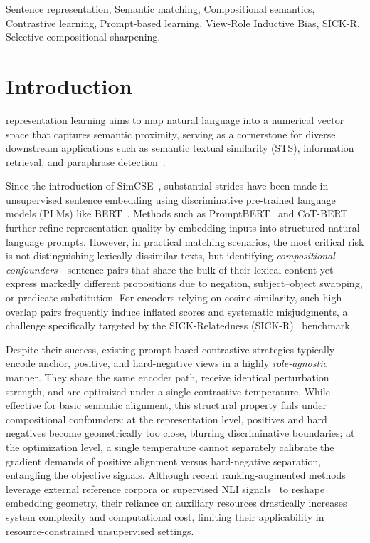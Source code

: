 \documentclass[lettersize,journal]{IEEEtran}
\begin{document}
\begin{IEEEkeywords}
Sentence representation, Semantic matching, Compositional semantics, Contrastive learning, Prompt-based learning, View-Role Inductive Bias, SICK-R, Selective compositional sharpening.
\end{IEEEkeywords}

\section{Introduction}
\label{sec:intro}


 representation learning aims to map natural language into a numerical vector space that captures semantic proximity, serving as a cornerstone for diverse downstream applications such as semantic textual similarity (STS), information retrieval, and paraphrase detection~\cite{sts3kcl}.

Since the introduction of SimCSE~\cite{simcse}, substantial strides have been made in unsupervised sentence embedding using discriminative pre-trained language models (PLMs) like BERT~\cite{bert}. Methods such as PromptBERT~\cite{promptbert} and CoT-BERT~\cite{cotbert} further refine representation quality by embedding inputs into structured natural-language prompts. However, in practical matching scenarios, the most critical risk is not distinguishing lexically dissimilar texts, but identifying \emph{compositional confounders}---sentence pairs that share the bulk of their lexical content yet express markedly different propositions due to negation, subject--object swapping, or predicate substitution. For encoders relying on cosine similarity, such high-overlap pairs frequently induce inflated scores and systematic misjudgments, a challenge specifically targeted by the SICK-Relatedness (SICK-R)~\cite{sick} benchmark.

Despite their success, existing prompt-based contrastive strategies typically encode anchor, positive, and hard-negative views in a highly \emph{role-agnostic} manner. They share the same encoder path, receive identical perturbation strength, and are optimized under a single contrastive temperature. While effective for basic semantic alignment, this structural property fails under compositional confounders: at the representation level, positives and hard negatives become geometrically too close, blurring discriminative boundaries; at the optimization level, a single temperature cannot separately calibrate the gradient demands of positive alignment versus hard-negative separation, entangling the objective signals. Although recent ranking-augmented methods~\cite{rankcse,rankencoder} leverage external reference corpora or supervised NLI signals~\cite{raoe} to reshape embedding geometry, their reliance on auxiliary resources drastically increases system complexity and computational cost, limiting their applicability in resource-constrained unsupervised settings.
\end{document}
